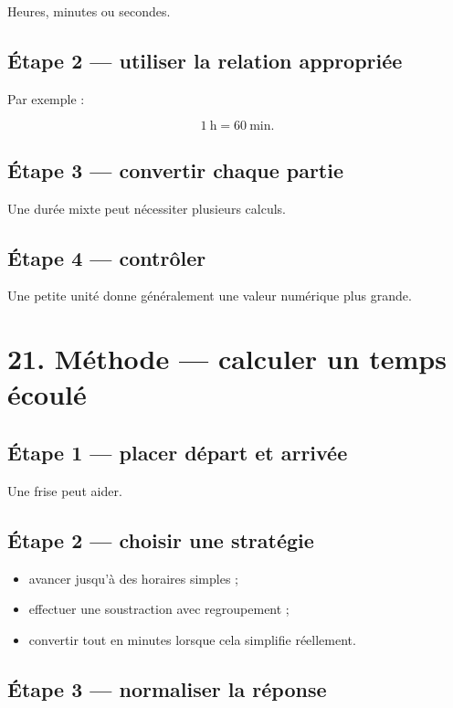 Heures, minutes ou secondes.

\subsection{Étape 2 — utiliser la relation appropriée}

Par exemple :

\[
1\ \text{h}=60\ \text{min}.
\]

\subsection{Étape 3 — convertir chaque partie}

Une durée mixte peut nécessiter plusieurs calculs.

\subsection{Étape 4 — contrôler}

Une petite unité donne généralement une valeur numérique plus grande.

\section{21. Méthode — calculer un temps écoulé}

\subsection{Étape 1 — placer départ et arrivée}

Une frise peut aider.

\subsection{Étape 2 — choisir une stratégie}

\begin{itemize}
\item avancer jusqu’à des horaires simples ;
\item effectuer une soustraction avec regroupement ;
\item convertir tout en minutes lorsque cela simplifie réellement.
\end{itemize}

\subsection{Étape 3 — normaliser la réponse}

